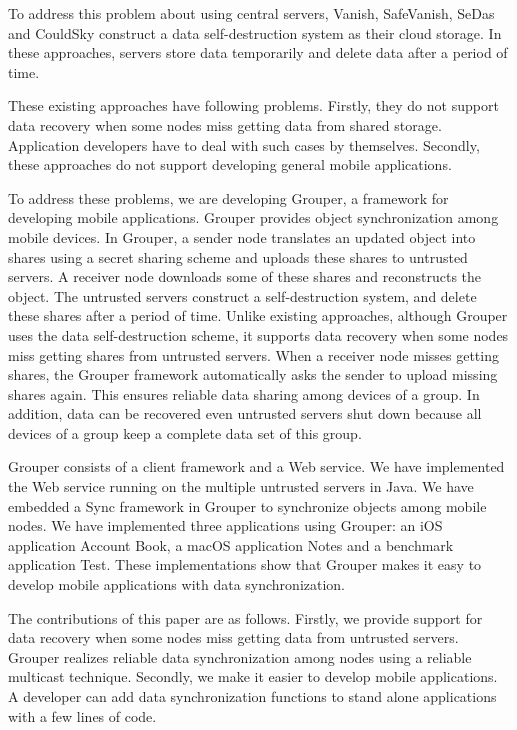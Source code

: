 \documentclass[twocolumn,10pt]{article}
\begin{document}
To address this problem about using central servers, Vanish\cite{geambasu2009vanish}, SafeVanish\cite{zeng2010safevanish}, SeDas\cite{zeng2012sedas} and CouldSky\cite{zeng2015cloudsky} construct a data self-destruction system as their cloud storage.
In these approaches, servers store data temporarily and delete data after a period of time.

These existing approaches have following problems.
Firstly, they do not support data recovery when some nodes miss getting data from shared storage.
Application developers have to deal with such cases by themselves.
Secondly, these approaches do not support developing general mobile applications.

To address these problems, we are developing Grouper, a framework for developing mobile applications. 
Grouper provides object synchronization among mobile devices.
In Grouper, a sender node translates an updated object into shares using a secret sharing scheme and uploads these shares to untrusted servers. 
A receiver node downloads some of these shares and reconstructs the object.
The untrusted servers construct a self-destruction system, and delete these shares after a period of time.
Unlike existing approaches, although Grouper uses the data self-destruction scheme, it supports data recovery when some nodes miss getting shares from untrusted servers.
When a receiver node misses getting shares, the Grouper framework automatically asks the sender to upload missing shares again.
This ensures reliable data sharing among devices of a group.
In addition, data can be recovered even untrusted servers shut down because all devices of a group keep a complete data set of this group.

Grouper consists of a client framework and a Web service.
We have implemented the Web service running on the multiple untrusted servers in Java. 
We have embedded a Sync framework in Grouper to synchronize objects among mobile nodes.
We have implemented three applications using Grouper: an iOS application Account Book, a macOS application Notes and a benchmark application Test.
These implementations show that Grouper makes it easy to develop mobile applications with data synchronization.

The contributions of this paper are as follows.
Firstly, we provide support for data recovery when some nodes miss getting data from untrusted servers.
Grouper realizes reliable data synchronization among nodes using a reliable multicast technique.
Secondly, we make it easier to develop mobile applications.
A developer can add data synchronization functions to stand alone applications with a few lines of code.
\end{document}
